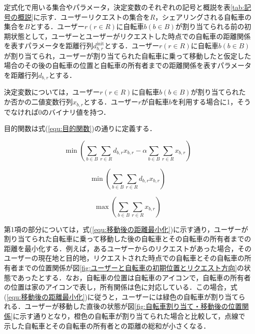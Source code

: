       \par 定式化で用いる集合やパラメータ，決定変数のそれぞれの記号と概説を表\ref{tab:記号の概説}に示す．ユーザーリクエストの集合を$R$，シェアリングされる自転車の集合を$B$とする．ユーザー$r (r \in R)$に自転車$b (b \in B)$が割り当てられる前の初期状態として，ユーザーとユーザーがリクエストした時点での自転車の距離関係を表すパラメータを距離行列$d^{\text{init}}_{b,r}$とする．ユーザー$r (r \in R)$に自転車$b (b \in B)$が割り当てられ，ユーザーが割り当てられた自転車に乗って移動したと仮定した場合のその後の自転車の位置と自転車の所有者までの距離関係を表すパラメータを距離行列$d_{b,r}$とする．
          
      
      \par 決定変数については，ユーザー$r (r \in R)$に自転車$b (b \in B)$が割り当てられたか否かの二値変数行列$x_{b,r}$とする．ユーザー$r$が自転車$b$を利用する場合に1，そうでなければ0のバイナリ値を持つ．
      
      \par 目的関数は式(\ref{equ:目的関数})の通りに定義する．
      
      \begin{equation}\label{equ:目的関数}
        \min \left( \sum_{b \in B}\sum_{r \in R}d_{b,r}x_{b,r} - \alpha\sum_{b \in B}\sum_{r \in R}x_{b,r} \right)
      \end{equation}
      
      \begin{equation}\label{equ:移動後の距離最小化}
        \min \left( \sum_{b \in B}\sum_{r \in R}d_{b,r}x_{b,r} \right)
      \end{equation}
      
      \begin{equation}\label{equ:割り当て成功率最大化}
        \max \left(\sum_{b \in B}\sum_{r \in R}x_{b,r} \right)
      \end{equation}
      
      \par 第1項の部分については，式(\ref{equ:移動後の距離最小化})に示す通り，ユーザーが割り当てられた自転車に乗って移動した後の自転車とその自転車の所有者までの距離を最小化する．例えば，あるユーザーからのリクエストがあった場合，そのユーザーの現在地と目的地，リクエストされた時点での自転車とその自転車の所有者までの位置関係が図\ref{fig:ユーザーと自転車の初期位置とリクエスト方向}の状態であったとする．なお，自転車の位置は自転車のアイコンで，自転車の所有者の位置は家のアイコンで表し，所有関係は色に対応している．この場合，式(\ref{equ:移動後の距離最小化})に従うと，ユーザーには緑色の自転車が割り当てられる．ユーザーが移動した直後の状態が図\ref{fig:自転車割り当て・移動後の位置関係}に示す通りとなり，橙色の自転車が割り当てられた場合と比較して，点線で示した自転車とその自転車の所有者との距離の総和が小さくなる．
      
